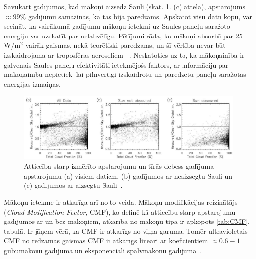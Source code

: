 Savukārt gadījumos, kad mākoņi aizsedz Sauli (skat. \ref{fig:makoni_ietekme}. (c) attēlā), apstarojums $\approx99\%$ gadījumu samazinās, kā tas bija paredzams.
Apskatot visu datu kopu, var secināt, ka vairākumā gadījumu mākoņu ietekmi uz Saules paneļu saražoto enerģiju var uzskatīt par nelabvēlīgu.
Pētījumi rāda, ka mākoņi absorbē par 25 W/m$^2$ vairāk gaismas, nekā teorētiski paredzams, un šī vērtība nevar būt izskaidrojama ar troposfēras aerosoliem ~\cite{observVSModel}. Neskatoties uz to, ka mākoņainība ir galvenais Saules paneļu efektivitāti ietekmējošs faktors, ar informāciju par mākoņainību nepietiek, lai pilnvērtīgi izskaidrotu un paredzētu paneļu saražotās enerģijas izmaiņas.

\begin{figure}[h]
	\centering
	\includegraphics[width=\linewidth]{figures/misc/makoni_ietekme.jpg}
	\caption{Attiecība starp izmērīto apstarojumu un tīrās debess gadījuma apstarojumu (a) visiem datiem, (b) gadījumos ar neaizsegtu Sauli un (c) gadījumos ar aizsegtu Sauli~\cite{CloudCoverageImpactOnIrradiance}.}
	\label{fig:makoni_ietekme}
\end{figure}

Mākoņu ietekme ir atkarīga arī no to veida. Mākoņu modifikācijas reizinātājs (\textit{Cloud Modification Factor}, CMF), ko definē kā attiecību starp apstarojumu gadījumos ar un bez mākoņiem, atkarībā no mākoņu tipa ir apkopots \ref{tab:CMF}. tabulā. Ir jāņem vērā, ka CMF ir atkarīgs no viļņa garuma. Tomēr ultravioletais CMF no redzamās gaismas CMF ir atkarīgs lineāri ar koeficientiem $\approx0.6-1$ gubumākoņu gadījumā un eksponenciāli spalvmākoņu gadījumā~\cite{effectCloudsOnSurface}.

